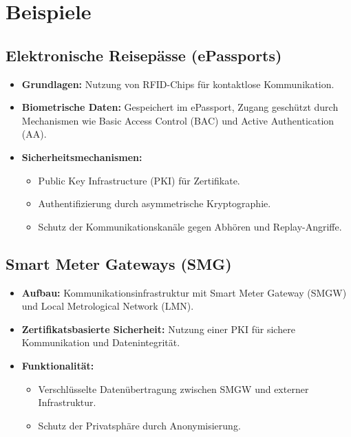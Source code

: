 \documentclass{article}
\begin{document}

\section{Beispiele}

\subsection{Elektronische Reisepässe (ePassports)}
\begin{itemize}
    \item \textbf{Grundlagen:} Nutzung von RFID-Chips für kontaktlose Kommunikation.
    \item \textbf{Biometrische Daten:} Gespeichert im ePassport, Zugang geschützt durch Mechanismen wie Basic Access Control (BAC) und Active Authentication (AA).
    \item \textbf{Sicherheitsmechanismen:}
    \begin{itemize}
        \item Public Key Infrastructure (PKI) für Zertifikate.
        \item Authentifizierung durch asymmetrische Kryptographie.
        \item Schutz der Kommunikationskanäle gegen Abhören und Replay-Angriffe.
    \end{itemize}
\end{itemize}

\subsection{Smart Meter Gateways (SMG)}
\begin{itemize}
    \item \textbf{Aufbau:} Kommunikationsinfrastruktur mit Smart Meter Gateway (SMGW) und Local Metrological Network (LMN).
    \item \textbf{Zertifikatsbasierte Sicherheit:} Nutzung einer PKI für sichere Kommunikation und Datenintegrität.
    \item \textbf{Funktionalität:}
    \begin{itemize}
        \item Verschlüsselte Datenübertragung zwischen SMGW und externer Infrastruktur.
        \item Schutz der Privatsphäre durch Anonymisierung.
    \end{itemize}
\end{itemize}
\end{document}
